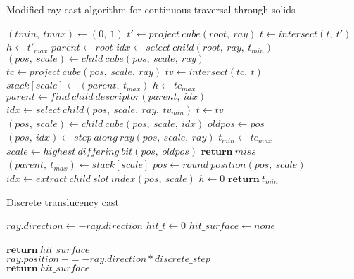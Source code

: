 \begin{algorithm}
\caption{Modified ray cast algorithm for continuous traversal through solids}
\label{alg:raycast_empty}
\begin{algorithmic}[1]
	\State $(tmin,~tmax) \gets (0,~1)$ 
	\State $t' \gets project~cube(root,~ray)$
	\State $t \gets intersect(t,~t')$
	\State $h \gets t'_{max}$
	\State $parent \gets root$
	\State $idx \gets select~child(root,~ray,~t_{min})$
	\State $(pos,~scale) \gets child~cube(pos,~scale,~ray)$
	 
		\State $tc \gets project~cube(pos,~scale,~ray)$
			\State $tv \gets intersect(tc, ~t)$ 
			 
					\State $stack[scale] \gets (parent,~t_{max})$
				\EndIf
				\State $h \gets tc_{max}$
				\State $parent \gets find~child~descriptor(parent,~idx)$
				\State $idx \gets select~child(pos,~scale,~ray,~tv_{min})$
				\State $t \gets tv$
				\State $(pos,~scale) \gets child~cube(pos,~scale,~idx)$
			\EndIf
		\EndIf
		\State $oldpos \gets pos$ 
		\State $(pos,~idx) \gets step~along~ray(pos,~scale,~ray)$
		\State $t_{min} \gets tc_{max}$
		 
			\State $scale \gets highest~differing~bit(pos,~oldpos)$
				\State $\textbf{return}~miss$
			\EndIf
			\State $(parent,~t_{max}) \gets stack[scale]$
			\State $pos \gets round~position(pos,~scale)$
			\State $idx \gets extract~child~slot~index(pos,~scale)$
			\State $h \gets 0$
		\EndIf
			
			\State $\textbf{return}~t_{min}$
		\EndIf
	\EndWhile
\EndProcedure
\end{algorithmic}
\end{algorithm}

\begin{algorithm}
\caption{Discrete translucency cast}
\label{alg:discrete_solid_cast}
\begin{algorithmic}[1]
	\State $ray.direction \gets -ray.direction$
	\State $hit\_t \gets 0$
	\State $hit\_surface \gets none$
	\\
		\State {}
		\\
			\State $\textbf{return}~hit\_surface$
		\EndIf
		\\
		\State $ray.position~+= -ray.direction * discrete\_step$
	\EndFor
	\\
	\State $\textbf{return}~hit\_surface$
\EndProcedure
\end{algorithmic}
\end{algorithm}

